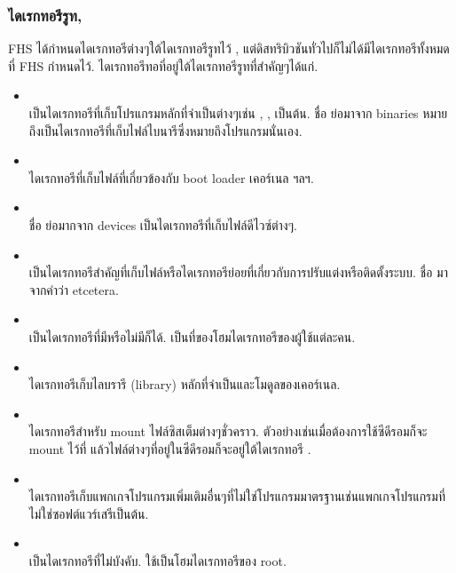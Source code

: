 \begin{thwbr}
\subsubsection{ไดเรกทอรีรูท, \cmd{/}}
FHS ได้กำหนดไดเรกทอรีต่างๆใต้ไดเรกทอรีรูทไว้ \cite{fhs}, แต่ดิสทริบิวชันทั่วไปก็ไม่ได้มีไดเรกทอรีทั้งหมดที่ FHS กำหนดไว้. ไดเรกทอรีทอที่อยู่ใต้ไดเรกทอรีรูทที่สำคัญๆได้แก่.
\begin{itemize}
\item {}\\
เป็นไดเรกทอรีที่เก็บโปรแกรมหลักที่จำเป็นต่างๆเช่น , ,  เป็นต้น. ชื่อ  ย่อมาจาก binaries หมายถึงเป็นไดเรกทอรีที่เก็บไฟล์ไบนารีซึ่งหมายถึงโปรแกรมนั่นเอง.
\item {}\\
ไดเรกทอรีที่เก็บไฟล์ที่เกี่ยวข้องกับ boot loader %
เคอร์เนล ฯลฯ.
\item {}\\
ชื่อ  ย่อมากจาก devices เป็นไดเรกทอรีที่เก็บไฟล์ดีไวซ์ต่างๆ. 
\item {}\\
เป็นไดเรกทอรีสำคัญที่เก็บไฟล์หรือไดเรกทอรีย่อยที่เกี่ยวกับการปรับแต่งหรือติดตั้งระบบ. ชื่อ  มาจากคำว่า etcetera.
\item {}\\
เป็นไดเรกทอรีที่มีหรือไม่มีก็ได้. เป็นที่ของโฮมไดเรกทอรีของผู้ใช้แต่ละคน.
\item {}\\
ไดเรกทอรีเก็บไลบรารี (library) หลักที่จำเป็นและโมดูลของเคอร์เนล.
\item {}\\
ไดเรกทอรีสำหรับ mount ไฟล์ซิสเต็มต่างๆชั่วคราว. ตัวอย่างเช่นเมื่อต้องการใช้ซีดีรอมก็จะ mount ไว้ที่  แล้วไฟล์ต่างๆที่อยู่ในซีดีรอมก็จะอยู่ใต้ไดเรกทอรี .
\item {}\\
ไดเรกทอรีเก็บแพกเกจโปรแกรมเพิ่มเติมอื่นๆที่ไม่ใช่โปรแกรมมาตรฐานเช่นแพกเกจโปรแกรมที่ไม่ใช่ซอฟต์แวร์เสรีเป็นต้น.
\item {}\\
เป็นไดเรกทอรีที่ไม่บังคับ. ใช้เป็นโฮมไดเรกทอรีของ root. 

\end{itemize}
\end{thwbr}
